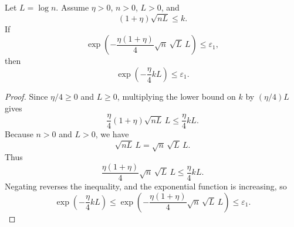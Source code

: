 \begin{helper}
Let \(L=\log n\).  Assume \(\eta>0\), \(n>0\), \(L>0\), and
\[
(1+\eta)\sqrt{nL}\le k.
\]
If
\[
\exp\!\left(-\frac{\eta(1+\eta)}4\sqrt n\,\sqrt L\,L\right)\le\varepsilon_1,
\]
then
\[
\exp\!\left(-\frac\eta4 kL\right)\le\varepsilon_1.
\]
\end{helper}
\begin{proof}
Since \(\eta/4\ge0\) and \(L\ge0\), multiplying the lower bound on \(k\) by
\((\eta/4)L\) gives
\[
\frac\eta4(1+\eta)\sqrt{nL}\,L\le \frac\eta4 kL.
\]
Because \(n>0\) and \(L>0\), we have
\[
\sqrt{nL}\,L=\sqrt n\,\sqrt L\,L.
\]
Thus
\[
\frac{\eta(1+\eta)}4\sqrt n\,\sqrt L\,L\le \frac\eta4 kL.
\]
Negating reverses the inequality, and the exponential function is increasing,
so
\[
\exp\!\left(-\frac\eta4 kL\right)
\le
\exp\!\left(-\frac{\eta(1+\eta)}4\sqrt n\,\sqrt L\,L\right)
\le\varepsilon_1.
\]
\end{proof}
